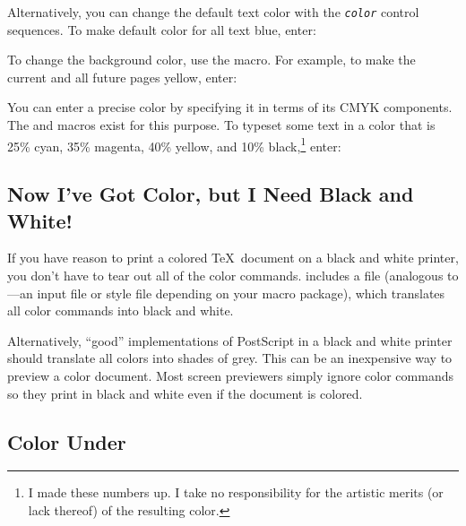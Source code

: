 \begin{shortexample}
\end{shortexample}

Alternatively, you can change the default text color with the 
\texttt{\textit{color}} control sequences.  To make default
color for all text blue, enter:

\begin{shortexample}
\textBlue
\end{shortexample}

\newpage
To change the background color, use the 
macro.  For example, to make the current and all future pages yellow,
enter:

\begin{shortexample}
\end{shortexample}

You can enter a precise color by specifying it in terms of its CMYK
components.  The  and  macros
exist for this purpose.  To typeset some text in a color that is
25\% cyan, 35\% magenta, 40\% yellow, and 10\% black,\footnote{I made
these numbers up.  I take no responsibility for the artistic merits
(or lack thereof) of the resulting color.} enter:

\begin{shortexample}
\end{shortexample}

\subsection{Now I've Got Color, but I Need Black and White!}

If you have reason to print a colored \TeX\ document on a black and white
printer, you don't have to tear out all of the color commands.  
includes a  file (analogous 
to ---an
input file or style file depending on your macro package), which translates
all color commands into black and white.

Alternatively, ``good'' implementations of PostScript in a black and white
printer should translate all colors into shades of grey.  This can be
an inexpensive way to preview a color document.
Most screen previewers simply ignore color commands so they print in
black and white even if the document is colored.

\subsection{Color Under \protect\LaTeXe}

